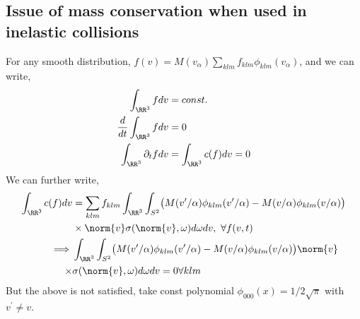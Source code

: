 \subsection{Issue of mass conservation when used in inelastic collisions}
For any smooth distribution, $f(v) = M(v_\alpha) \sum_{klm} f_{klm} \phi_{klm}(v_\alpha)$, and we can write, 
\begin{align}
\int_{\RR^3} f dv &= const.  \\
\frac{d}{dt} \int_{\RR^3} f dv &= 0  \\
\int_{\RR^3} \partial_t f  dv &= \int_{\RR^3} c(f) dv =0 \\
\end{align}
We can further write, 
\begin{align}
\int_{\RR^3} c(f) dv  &= \sum_{klm} f_{klm} \int_{\RR^3}\int_{S^2} \bigl( M(v^\prime/\alpha) \phi_{klm}(v^\prime/\alpha) -   M(v/\alpha) \phi_{klm}(v/\alpha) \bigr) \\ &\times\norm{v} \sigma(\norm{v},\omega) d\omega dv, \  \forall f(v,t) \\
\implies & \int_{\RR^3}\int_{S^2} \bigl( M(v^\prime/\alpha) \phi_{klm}(v^\prime/\alpha) -   M(v/\alpha) \phi_{klm}(v/\alpha) \bigr) \norm{v} \\ \times &\sigma(\norm{v},\omega) d\omega dv =0  \forall klm
\end{align}
But the above is not satisfied, take const polynomial $\phi_{000}(x)=1/2\sqrt{\pi}$ with $v^\prime \neq v$.
%


